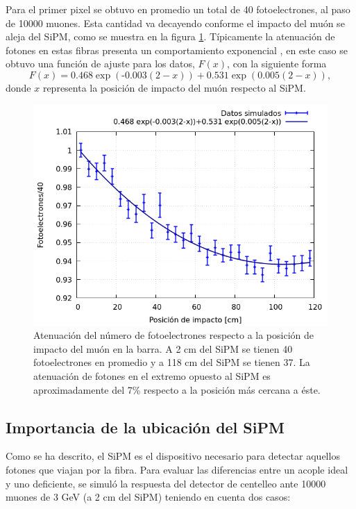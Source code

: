 \documentclass[12pt,oneside,openany,letter]{book}
\begin{document}
Para el primer pixel se obtuvo en promedio un total de 40 fotoelectrones, al paso de 10000 muones. Esta cantidad va decayendo conforme el impacto del muón se aleja del SiPM, como se muestra en la figura \ref{atenuacion_barra}. Típicamente la atenuación de fotones en estas fibras presenta un comportamiento exponencial \cite{Gonzalez-maestrando2012}, en este caso se obtuvo una función de ajuste para los datos, $F(x)$, con la siguiente forma
\begin{equation}
F(x)= \text{0.468} \exp(\text{-0.003}(2-x))+\text{0.531} \exp(\text{0.005}(2-x)),
\end{equation}
donde $x$ representa la posición de impacto del muón respecto al SiPM.
\begin{figure}[h!]
    \centering
        \includegraphics[scale=0.55]{images/atenuacion_barra_2.png}
   \caption[Atenuación del número de fotoelectrones respecto a la posición de impacto del muón en la barra]{Atenuación del número de fotoelectrones respecto a la posición de impacto del muón en la barra. A 2 cm del SiPM se tienen 40 fotoelectrones en promedio y a 118 cm del SiPM se tienen 37. La atenuaci\'on de fotones en el extremo opuesto al SiPM es aproximadamente del 7\% respecto a la posici\'on m\'as cercana a \'este.}\label{atenuacion_barra}
\end{figure}

\subsection{Importancia de la ubicación del SiPM}
Como se ha descrito, el SiPM es el dispositivo necesario para detectar aquellos fotones que viajan por la fibra. Para evaluar las diferencias entre un acople ideal y uno deficiente, se simuló la respuesta del detector de centelleo ante 10000 muones de 3 GeV (a 2 cm del SiPM) teniendo en cuenta dos casos:
\end{document}
